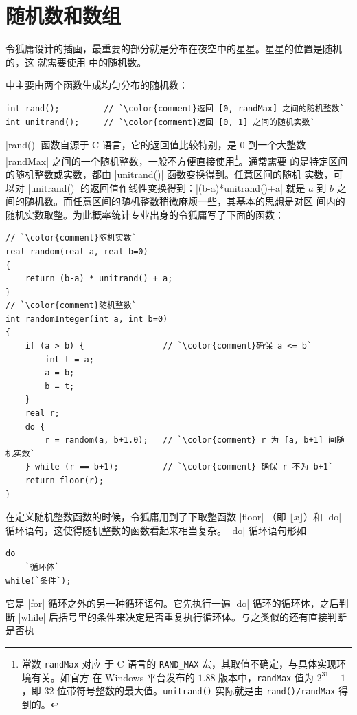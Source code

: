 \section{随机数和数组}
\label{sec:randomarray}

令狐庸设计的插画，最重要的部分就是分布在夜空中的星星。星星的位置是随机的，这
就需要使用 \Asy{} 中的随机数。

\Asy{} 中主要由两个函数生成均匀分布的随机数：
\begin{lstlisting}
int rand();         // `\color{comment}返回 [0, randMax] 之间的随机整数`
int unitrand();     // `\color{comment}返回 [0, 1] 之间的随机实数`
\end{lstlisting}
|rand()| 函数自源于 C 语言，它的返回值比较特别，是 $0$ 到一个大整数 |randMax|
之间的一个随机整数，一般不方便直接使用\footnote{常数 \lstinline=randMax= 对应
于 C 语言的 \lstinline=RAND_MAX= 宏，其取值不确定，与具体实现环境有关。如官方
在 Windows 平台发布的 $1.88$ 版本中，\lstinline=randMax= 值为 $2^{31}-1$，即
32 位带符号整数的最大值。\lstinline=unitrand()= 实际就是由
\lstinline=rand()/randMax= 得到的。}。通常需要
的是特定区间的随机整数或实数，都由 |unitrand()| 函数变换得到。任意区间的随机
实数，可以对 |unitrand()| 的返回值作线性变换得到：|(b-a)*unitrand()+a| 就是
$a$ 到 $b$ 之间的随机数。而任意区间的随机整数稍微麻烦一些，其基本的思想是对区
间内的随机实数取整。为此概率统计专业出身的令狐庸写了下面的函数：
\begin{lstlisting}
// `\color{comment}随机实数`
real random(real a, real b=0)
{
    return (b-a) * unitrand() + a;
}
// `\color{comment}随机整数`
int randomInteger(int a, int b=0)
{
    if (a > b) {                // `\color{comment}确保 a <= b`
        int t = a;
        a = b;
        b = t;
    }
    real r;
    do {
        r = random(a, b+1.0);   // `\color{comment} r 为 [a, b+1] 间随机实数`
    } while (r == b+1);         // `\color{comment} 确保 r 不为 b+1`
    return floor(r);
}
\end{lstlisting}
在定义随机整数函数的时候，令狐庸用到了下取整函数 |floor|
（即 $\lfloor x\rfloor$）和
|do| 循环语句，这使得随机整数的函数看起来相当复杂。
|do| 循环语句形如
\begin{lstlisting}
do
    `循环体`
while(`条件`);
\end{lstlisting}
它是 |for| 循环之外的另一种循环语句。它先执行一遍 |do| 循环的循环体，之后判断
|while| 后括号里的条件来决定是否重复执行循环体。与之类似的还有直接判断是否执
